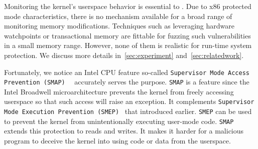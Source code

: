 






Monitoring the kernel's userspace behavior is essential to \name. Due to x86 protected mode characteristics, there is no mechanism available for a broad range of monitoring memory modifications. Techniques such as leveraging hardware watchpoints or transactional memory are fittable for fuzzing such vulnerabilities in a small memory range. However, none of them is realistic for run-time system protection. We discuss more details in~\autoref{sec:experiment} and~\autoref{sec:relatedwork}.

Fortunately, we notice an Intel CPU feature so-called \texttt{Supervisor Mode Access Prevention (SMAP)}~\cite{corbet2012supervisorsmap}~\cite{mulnix2016intel} accurately serves the purpose.
\texttt{SMAP} is a feature since the Intel Broadwell microarchitecture prevents the kernel from freely accessing userspace so that such access will raise an exception. It complements \texttt{Supervisor Mode Execution Prevention (SMEP)}~\cite{fischer2011supervisor} that introduced earlier. \texttt{SMEP} can be used to prevent the kernel from unintentionally executing user-mode code. \texttt{SMAP} extends this protection to reads and writes. It makes it harder for a malicious program to deceive the kernel into using code or data from the userspace.

